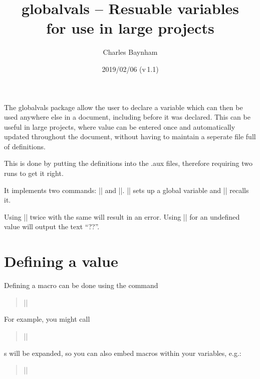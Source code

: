 \documentclass[a4paper]{ltxdoc}
\begin{document}
\title{\textsf{globalvals} -- Resuable variables \\ 
for use in large projects}
\author{Charles Baynham}
\date{2019/02/06 (v\,1.1)}
\maketitle

\noindent
The \textsf{globalvals} package allow the user to declare a variable which can then be used anywhere else in a document, including before it was declared. This can be useful in large projects, where value can be entered once and automatically updated throughout the document, without having to maintain a seperate file full of definitions. 

This is done by putting the definitions into the .aux files, therefore requiring two runs to get it right.

It implements two commands: || and ||. ||
sets up a global variable and |\useVal| recalls it.

Using || twice with the same  will result in an error. Using |\useVal| for an undefined
value will output the text ``\textsc{??}''.

\section{Defining a value}
\label{sec:defining}

%
Defining a macro can be done using the command 
\begin{quote}
	||
\end{quote}

For example, you might call 
\begin{quote}
	||
\end{quote}

s will be expanded, so you can also embed macros within your variables, e.g.:
\begin{quote}
	||
\end{quote}
\end{document}
